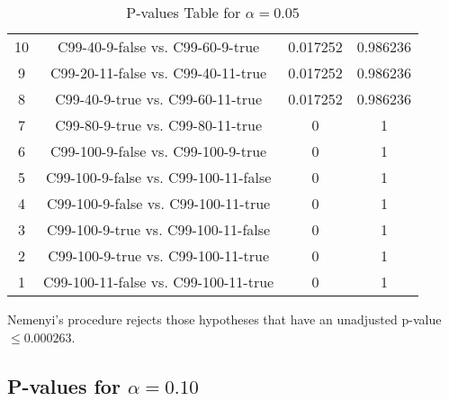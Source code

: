 \documentclass[a4paper,10pt]{article}
\begin{document}
\begin{landscape}
\begin{table}[!htp]
\begin{tabular}{cccc}
10&C99-40-9-false vs. C99-60-9-true&0.017252&0.986236\\
9&C99-20-11-false vs. C99-40-11-true&0.017252&0.986236\\
8&C99-40-9-true vs. C99-60-11-true&0.017252&0.986236\\
7&C99-80-9-true vs. C99-80-11-true&0&1\\
6&C99-100-9-false vs. C99-100-9-true&0&1\\
5&C99-100-9-false vs. C99-100-11-false&0&1\\
4&C99-100-9-false vs. C99-100-11-true&0&1\\
3&C99-100-9-true vs. C99-100-11-false&0&1\\
2&C99-100-9-true vs. C99-100-11-true&0&1\\
1&C99-100-11-false vs. C99-100-11-true&0&1\\
\hline
\end{tabular}
\caption{P-values Table for $\alpha=0.05$}
\end{table}Nemenyi's procedure rejects those hypotheses that have an unadjusted p-value $\le0.000263$.

\pagebreak

\subsection{P-values for $\alpha=0.10$}


\end{landscape}
\end{document}
